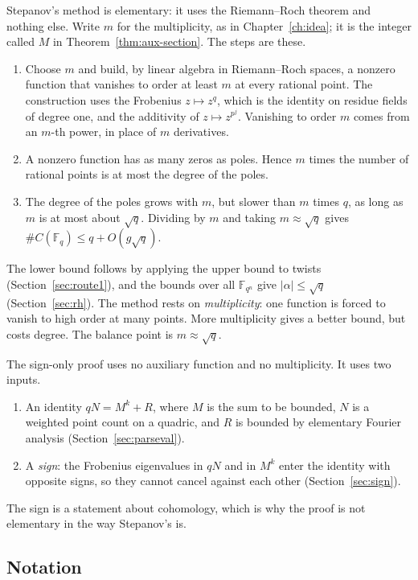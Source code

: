 \documentclass[11pt]{amsbook}
\theoremstyle{plain}
\theoremstyle{definition}
\theoremstyle{remark}
\numberwithin{equation}{section}
\numberwithin{figure}{chapter}
\numberwithin{table}{chapter}
\newcommand{\F}{\mathbb{F}}
\begin{document}
Stepanov's method is elementary: it uses the Riemann--Roch theorem
and nothing else. Write $m$ for the multiplicity, as in
Chapter~\ref{ch:idea}; it is the integer called $M$ in
Theorem~\ref{thm:aux-section}. The steps are these.
\begin{enumerate}[label=(\arabic*)]
\item Choose $m$ and build, by linear algebra in Riemann--Roch
  spaces, a nonzero function that vanishes to order at least $m$
  at every rational point. The construction uses the Frobenius
  $z \mapsto z^q$, which is the identity on residue fields of
  degree one, and the additivity of $z \mapsto z^{p^j}$.
  Vanishing to order $m$ comes from an $m$-th power, in place of
  $m$ derivatives.
\item A nonzero function has as many zeros as poles. Hence $m$
  times the number of rational points is at most the degree of the
  poles.
\item The degree of the poles grows with $m$, but slower than $m$
  times $q$, as long as $m$ is at most about $\sqrt q$. Dividing by
  $m$ and taking $m \approx \sqrt q$ gives
  $\#C(\F_q) \le q + O(g\sqrt q)$.
\end{enumerate}
The lower bound follows by applying the upper bound to twists
(Section~\ref{sec:route1}), and the bounds over all $\F_{q^n}$ give
$|\alpha| \le \sqrt q$ (Section~\ref{sec:rh}). The method rests on
\emph{multiplicity}: one function is forced to vanish to high order
at many points. More multiplicity gives a better bound, but costs
degree. The balance point is $m \approx \sqrt q$.

The sign-only proof uses no auxiliary function and no multiplicity.
It uses two inputs.
\begin{enumerate}[label=(\alph*)]
\item An identity $qN = M^k + R$, where $M$ is the sum to be
  bounded, $N$ is a weighted point count on a quadric, and $R$ is
  bounded by elementary Fourier analysis
  (Section~\ref{sec:parseval}).
\item A \emph{sign}: the Frobenius eigenvalues in $qN$ and in
  $M^k$ enter the identity with opposite signs, so they cannot
  cancel against each other (Section~\ref{sec:sign}).
\end{enumerate}
The sign is a statement about cohomology, which is why the proof is
not elementary in the way Stepanov's is.

\subsection{Notation}\label{sec:notation}
\end{document}

